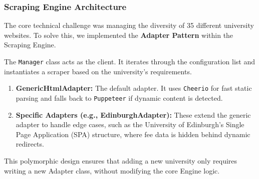 \subsubsection{Scraping Engine Architecture}
The core technical challenge was managing the diversity of 35 different university websites. To solve this, we implemented the \textbf{Adapter Pattern} within the Scraping Engine.

The \texttt{Manager} class acts as the client. It iterates through the configuration list and instantiates a scraper based on the university's requirements.
\begin{enumerate}
    \item \textbf{GenericHtmlAdapter:} The default adapter. It uses \texttt{Cheerio} for fast static parsing and falls back to \texttt{Puppeteer} if dynamic content is detected.
    \item \textbf{Specific Adapters (e.g., EdinburghAdapter):} These extend the generic adapter to handle edge cases, such as the University of Edinburgh's Single Page Application (SPA) structure, where fee data is hidden behind dynamic redirects.
\end{enumerate}

This polymorphic design ensures that adding a new university only requires writing a new Adapter class, without modifying the core Engine logic.

